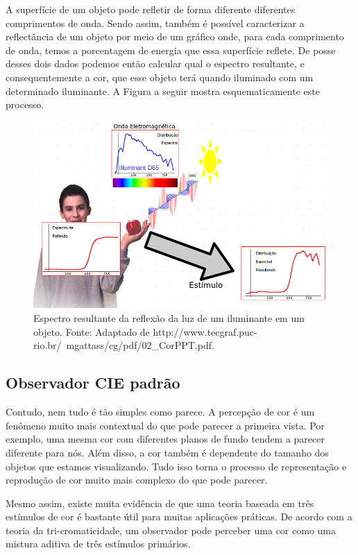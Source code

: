 \par
A superfície de um objeto pode refletir de forma diferente diferentes
comprimentos de onda. Sendo assim, também é possível caracterizar a
reflectância de um objeto por meio de um gráfico onde, para cada comprimento de
onda, temos a porcentagem de energia que essa superfície reflete. De posse
desses dois dados podemos então calcular qual o espectro resultante, e
consequentemente a cor, que esse objeto terá quando iluminado com um
determinado iluminante. A Figura a seguir mostra esquematicamente este processo.

\begin{figure}[!htb]
     \centering
     \includegraphics[scale=0.9]{img/spectrum_reflection.png}
     \caption{Espectro resultante da reflexão da luz de um iluminante em
um objeto. Fonte: Adaptado de 
{http://www.tecgraf.puc-rio.br/~mgattass/cg/pdf/02_CorPPT.pdf}.}
     \label{fig:spectrum_reflection}
\end{figure}

\subsection{Observador CIE padrão}
\par
Contudo, nem tudo é tão simples como parece. A percepção de cor é um fenômeno
muito mais contextual do que pode parecer a primeira vista. Por exemplo, uma
mesma cor com diferentes planos de fundo tendem a parecer diferente para nós.
Além disso, a cor também é dependente do tamanho dos objetos que estamos
visualizando. Tudo isso torna o processo de representação e reprodução de cor
muito mais complexo do que pode parecer.

\par
Mesmo assim, existe muita evidência de que uma teoria baseada em três estímulos
de cor é bastante útil para muitas aplicações práticas. De acordo com a teoria
da tri-cromaticidade, um observador pode perceber uma cor como uma mistura
aditiva de três estímulos primários.

